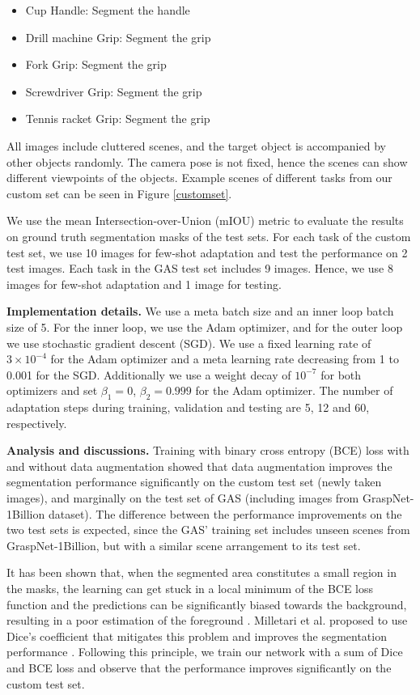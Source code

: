 \documentclass[letterpaper]{article} %
\begin{document}
\begin{itemize}
    \item Cup Handle: Segment the handle
    \item Drill machine Grip: Segment the grip
    \item Fork Grip: Segment the grip
    \item Screwdriver Grip: Segment the grip
    \item Tennis racket Grip: Segment the grip
\end{itemize}

All images include cluttered scenes, and the target object is accompanied by other objects randomly. The camera pose is not fixed, hence the scenes can show different viewpoints of the objects. Example scenes of different tasks from our custom set can be seen in Figure \ref{customset}.

We use the mean Intersection-over-Union (mIOU) metric to evaluate the results on ground truth segmentation masks of the test sets. For each task of the custom test set, we use 10 images for few-shot adaptation and test the performance on 2 test images. Each task in the GAS test set includes 9 images. Hence, we use 8 images for few-shot adaptation and 1 image for testing.

\textbf{Implementation details.} We use a meta batch size and an inner loop batch size of 5. For the inner loop, we use the Adam optimizer, and for the outer loop we use stochastic gradient descent (SGD). We use a fixed learning rate of $3 \times 10^{-4}$ for the Adam optimizer and a meta learning rate decreasing from 1 to 0.001 for the SGD. Additionally we use a weight decay of $10^{-7}$ for both optimizers and set $\beta_{1}=0$, $\beta_{2}=0.999$ for the Adam optimizer. The number of adaptation steps during training, validation and testing are 5, 12 and 60, respectively.

\textbf{Analysis and discussions.} Training with binary cross entropy (BCE) loss with and without data augmentation showed that data augmentation improves the segmentation performance significantly on the custom test set (newly taken images), and marginally on the test set of GAS (including images from GraspNet-1Billion dataset). The difference between the performance improvements on the two test sets is expected, since the GAS' training set includes unseen scenes from GraspNet-1Billion, but with a similar scene arrangement to its test set.

It has been shown that, when the segmented area constitutes a small region in the masks, the learning can get stuck in a local minimum of the BCE loss function and the predictions can be significantly biased towards the background, resulting in a poor estimation of the foreground \cite{milletari2016v}. Milletari et al. proposed to use Dice's coefficient that mitigates this problem and improves the segmentation performance \cite{milletari2016v}. Following this principle, we train our network with a sum of Dice and BCE loss and observe that the performance improves significantly on the custom test set.
\end{document}
